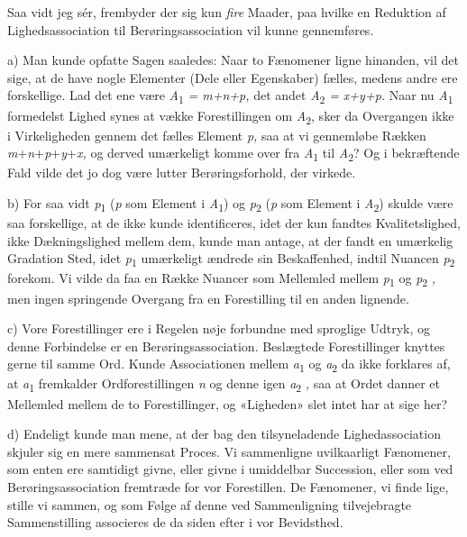 \documentclass[12pt,a4paper,openany]{book}
\begin{document}
Saa vidt jeg sér, frembyder der sig kun \emph{fire} Maader, paa hvilke en
Reduktion af Lighedsassociation til Berøringsassociation vil kunne gennemføres.

a) Man kunde opfatte Sagen saaledes: Naar to Fænomener ligne hinanden, vil det
sige, at de have nogle Elementer (Dele eller Egenskaber) fælles, medens andre
ere forskellige. Lad det ene være \textit{A}\textsubscript{1} \textit{ =
m+n+p,} det andet \textit{A}\textsubscript{2} \textit{ = x+y+p.} Naar nu
\textit{A}\textsubscript{1} formedelst Lighed synes at vække Forestillingen om
\textit{A}\textsubscript{2}, sker da Overgangen ikke i Virkeligheden gennem det
fælles Element \textit{p,} saa at vi gennemløbe Rækken
\textit{m}+\textit{n}+\textit{p}+\textit{y}+\textit{x,} og derved umærkeligt
komme over fra \textit{A}\textsubscript{1} til \textit{A}\textsubscript{2}? Og
i bekræftende Fald vilde det jo dog være lutter Berøringsforhold, der virkede.

b) For saa vidt \textit{p}\textsubscript{1} (\textit{p} som Element i
\textit{A}\textsubscript{1}) og \textit{p}\textsubscript{2} (\textit{p} som
Element i \textit{A}\textsubscript{2}) skulde være saa forskellige, at de ikke
kunde identificeres, idet der kun fandtes Kvalitetslighed, ikke Dækningslighed
mellem dem, kunde man antage, at der fandt en umærkelig Gradation Sted, idet
\textit{p}\textsubscript{1} umærkeligt ændrede sin Beskaffenhed, indtil Nuancen
\textit{p}\textsubscript{2} forekom. Vi vilde da faa en Række Nuancer som
Mellemled mellem \textit{p}\textsubscript{1} og \textit{p}\textsubscript{2}
\textit{,} men ingen springende Overgang fra en Forestilling til en anden lignende.

c) Vore Forestillinger ere i Regelen nøje forbundne med sproglige Udtryk, og
denne Forbindelse er en Berøringsassociation. Beslægtede Forestillinger knyttes
gerne til samme Ord. Kunde Associationen mellem \textit{a}\textsubscript{1} og
\textit{a}\textsubscript{2} da ikke forklares af, at
\textit{a}\textsubscript{1} fremkalder Ordforestillingen \textit{n} og denne
igen \textit{a}\textsubscript{2} \textit{,} saa at Ordet danner et Mellemled
mellem de to Forestillinger, og «Ligheden» slet intet har at sige her?

d) Endeligt kunde man mene, at der bag den tilsyneladende Lighedassociation %
skjuler sig en mere sammensat Proces. Vi sammenligne uvilkaarligt Fænomener,
som enten ere samtidigt givne, eller givne i umiddelbar Succession, eller som
ved Berøringsassociation fremtræde for vor Forestillen. De Fænomener, vi finde
lige, stille vi sammen, og som Følge af denne ved Sammenligning tilvejebragte
Sammenstilling associeres de da siden efter i vor Bevidsthed.
\end{document}
